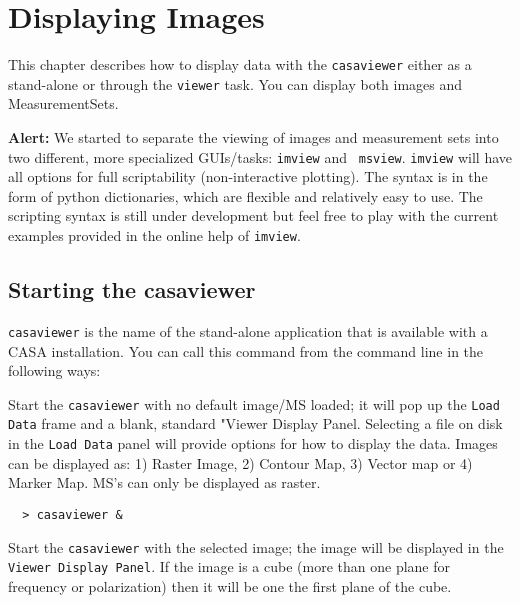 

\chapter{Displaying Images}
\label{chapter:viewer}

This chapter describes how to display data with the {\tt casaviewer}
either as a stand-alone or through the {\tt viewer} task. You can
display both images and MeasurementSets.

{\bf Alert:} We started to separate the viewing of images and
measurement sets into two different, more specialized GUIs/tasks: {\tt imview} and {\tt
  msview}. {\tt imview} will have all options for
full scriptability (non-interactive plotting). The syntax is in the
form of python dictionaries, which are flexible and relatively easy
to use. The scripting syntax is still under
development but feel free to play with the current examples provided
in the online help of {\tt imview}.

\section{Starting the casaviewer}
\label{section:viewer.start}

{\tt casaviewer} is the name of the stand-alone application that is
available with a CASA installation. You can call this command from the
command line in the following ways:

Start the {\tt casaviewer} with no default image/MS loaded; it will
pop up the {\tt Load Data} frame and a blank, standard "Viewer Display
Panel. Selecting a file on disk in the {\tt Load Data} panel will
provide options for how to display the data. Images can be displayed
as: 1) Raster Image, 2) Contour Map, 3) Vector map or 4) Marker
Map.  MS's can only be displayed as raster.

\small
\begin{verbatim}
  > casaviewer &
\end{verbatim}
\normalsize

Start the {\tt casaviewer} with the selected image; the image will be
displayed in the {\tt Viewer Display Panel}. If the image is a cube (more
than one plane for frequency or polarization) then it will be one the
first plane of the cube.

